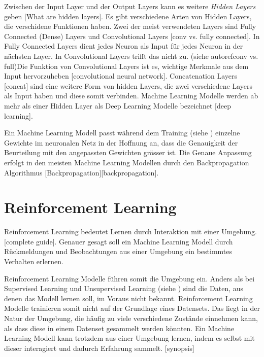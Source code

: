 
Zwischen der Input Layer und der Output Layers kann es weitere \emph{Hidden
Layers} geben [What are hidden layers]. Es gibt verschiedene Arten von Hidden
Layers, die verschidene Funktionen haben. Zwei der meist verwendeten Layers sind
Fully Connected (Dense) Layers und Convolutional Layers [conv vs. fully
connected]. In Fully Connected Layers dient jedes Neuron als Input für jedes
Neuron in der nächsten Layer. In Convolutional Layers trifft das nicht zu.
(siehe autoref{conv vs. full})Die Funktion von Convolutional Layers ist es,
wichtige Merkmale aus dem Input hervorzuheben [convolutional neural network].
Concatenation Layers [concat] sind eine weitere Form von hidden Layers, die zwei
verschiedene Layers als Input haben und diese somit verbinden. Machine Learning
Modelle werden ab mehr als einer Hidden Layer als Deep Learning Modelle
bezeichnet [deep learning].


Ein Machine Learning Modell passt während dem Training (siehe
) einzelne Gewichte im neuronalen Netz in der
Hoffnung an, dass die Genauigkeit der Beurteilung mit den angepassten Gewichten
grösser ist. Die Genaue Anpassung erfolgt in den meisten Machine Learning
Modellen durch den Backpropagation Algorithmus [Backpropagation][backpropagation].

\section{Reinforcement Learning}\label{chap:t_rl}
Reinforcement Learning bedeutet Lernen durch Interaktion mit einer Umgebung.
[complete guide]. Genauer gesagt soll ein Machine Learning Modell durch
Rückmeldungen und Beobachtungen aus einer Umgebung ein bestimmtes Verhalten
erlernen.

Reinforcement Learning Modelle führen somit die Umgebung ein. Anders als bei
Supervised Learning und Unsupervised Learning (siehe ) sind
die Daten, aus denen das Modell lernen soll, im Voraus nicht bekannt.
Reinforcement Learning Modelle trainieren somit nicht auf der Grundlage eines
Datensets. Das liegt in der Natur der Umgebung, die häufig zu viele verschiedene
Zustände einnehmen kann, als dass diese in einem Datenset gesammelt werden
könnten. Ein Machine Learning Modell kann trotzdem aus einer Umgebung lernen,
indem es selbst mit dieser interagiert und dadurch Erfahrung sammelt. [synopsis]

